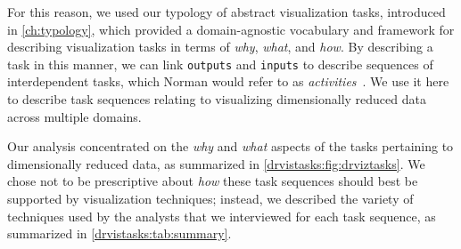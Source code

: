 For this reason, we used our typology of abstract visualization tasks, introduced in \autoref{ch:typology}, which provided a domain-agnostic vocabulary and framework for describing visualization tasks in terms of {\it why}, {\it what}, and {\it how}.
By describing a task in this manner, we can link {\tt outputs} and {\tt inputs} to describe sequences of interdependent tasks, which Norman would refer to as {\it activities}~\cite{Norman2005}. 
We use it here to describe task sequences relating to visualizing dimensionally reduced data across multiple domains.

Our analysis concentrated on the {\it why} and {\it what} aspects of the tasks pertaining to dimensionally reduced data, as summarized in \autoref{drvistasks:fig:drviztasks}.
We chose not to be prescriptive about {\it how} these task sequences should best be supported by visualization techniques; instead, we described the variety of techniques used by the analysts that we interviewed for each task sequence, as summarized in \autoref{drvistasks:tab:summary}.


